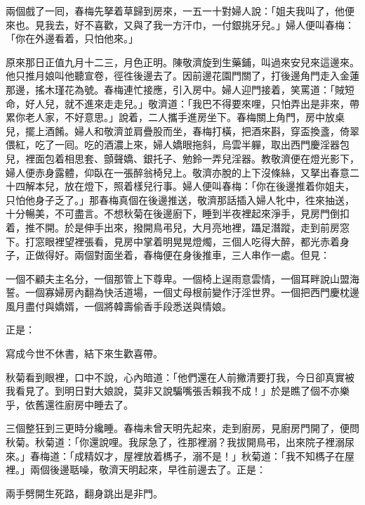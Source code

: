 兩個戲了一囘，春梅先拏着草歸到房來，一五一十對婦人說：「姐夫我叫了，他便來也。見我去，好不喜歡，又與了我一方汗巾，一付銀挑牙兒。」婦人便叫春梅：「你在外邊看着，只怕他來。」

原來那日正值九月十二三，月色正明。陳敬濟旋到生藥鋪，叫過來安兒來這邊來。他只推月娘叫他聽宣卷，徑徃後邊去了。因前邊花園門關了，打後邊角門走入金蓮那邊，搖木瑾花為號。春梅連忙接應，引入房中。婦人迎門接着，笑罵道：「賊短命，好人兒，就不進來走走兒。」敬濟道：「我巴不得要來哩，只怕弄出是非來，帶累你老人家，不好意思。」說着，二人攜手進房坐下。春梅關上角門，房中放桌兒，擺上酒餚。婦人和敬濟並肩疊股而坐，春梅打橫，把酒來斟，穿盃換盞，倚翠偎紅，吃了一囘。吃的酒濃上來，婦人嬌眼拖斜，烏雲半軃，取出西門慶淫器包兒，裡面包着相思套、顫聲嬌、銀托子、勉鈴一弄兒淫器。{}教敬濟便在燈光影下，婦人便赤身露體，仰臥在一張醉翁椅兒上。敬濟亦脫的上下沒條絲，又拏出春意二十四解本兒，放在燈下，照着樣兒行事。婦人便叫春梅：「你在後邊推着你姐夫，只怕他身子乏了。」那春梅真個在後邊推送，敬濟那話插入婦人牝中，徃來抽送，十分暢美，不可盡言。不想秋菊在後邊廚下，睡到半夜裡起來淨手，見房門倒扣着，推不開。於是伸手出來，撥開鳥弔兒，大月亮地裡，躡足潛蹤，走到前房窓下。打窓眼裡望裡張看，見房中掌着明晃晃燈燭，三個人吃得大醉，都光赤着身子，正做得好。兩個對面坐着，春梅便在身後推車，三人串作一處。{}但見：

\begin{myquote}
一個不顧夫主名分，一個那管上下尊卑。一個椅上逞雨意雲情，一個耳畔說山盟海誓。一個寡婦房內翻為快活道場，一個丈母根前變作汙淫世界。一個把西門慶枕邊風月盡付與嬌婿，一個將韓壽偷香手段悉送與情娘。
\end{myquote}

正是：

\begin{myquote}
寫成今世不休書，結下來生歡喜帶。
\end{myquote}

秋菊看到眼裡，口中不說，心內暗道：「他們還在人前撇清要打我，今日卻真實被我看見了。到明日對大娘說，莫非又說騙嘴張舌賴我不成！」{}於是瞧了個不亦樂乎，依舊還徃廚房中睡去了。

三個整狂到三更時分纔睡。春梅未曾天明先起來，走到廚房，見廚房門開了，便問秋菊。秋菊道：「你還說哩。我尿急了，徃那裡溺？我拔開鳥弔，出來院子裡溺尿來。」{}春梅道：「成精奴才，屋裡放着榪子，溺不是！」秋菊道：「我不知榪子在屋裡。」兩個後邊聒噪，敬濟天明起來，早徃前邊去了。正是：

\begin{myquote}
兩手劈開生死路，翻身跳出是非門。
\end{myquote}

